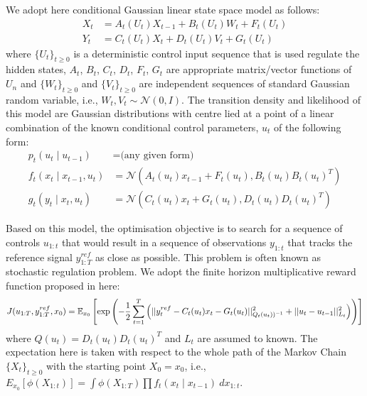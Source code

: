 We adopt here conditional Gaussian linear state space model as follows:
\begin{align}
  X_t &= A_t(U_t)X_{t-1} + B_t(U_t)W_t + F_t(U_t) \nonumber \\
  Y_t &= C_t(U_t)X_t + D_t(U_t)V_t + G_t(U_t)
\label{eq:model}
\end{align}
where $\{U_t\}_{t \geq 0}$ is a deterministic control input sequence that is used regulate the hidden states, $A_t$, $B_t$, $C_t$, $D_t$, $F_t$, $G_t$ are appropriate matrix/vector functions of $U_n$ and  $\{W_t\}_{t \geq 0}$ and  $\{V_t\}_{t \geq 0}$ are independent sequences of standard Gaussian random variable, i.e., $W_t, V_t \sim \mathcal{N}(0,I)$. The transition density and likelihood of this model are Gaussian distributions with centre lied at a point of a linear combination of the known conditional control parameters, $u_t$ of the following form:
\begin{align}
  p_t(u_t \mid u_{t-1}) &= \textrm{(any given form)} \nonumber \\
  f_t(x_t \mid x_{t-1}, u_t) &= \mathcal{N}(A_t(u_t) x_{t-1} + F_t(u_t), B_t(u_t)B_t(u_t)^T) \nonumber \\
  g_t(y_t \mid x_t, u_t)    &= \mathcal{N}(C_t(u_t) x_t + G_t(u_t), D_t(u_t)D_t(u_t)^T)
\end{align}

Based on this model, the optimisation objective is to search for a sequence of controls $u_{1:t}$ that would result in a sequence of observations $y_{1:t}$ that tracks the reference signal $y^{ref}_{1:T}$ as close as possible. This problem is often known as stochastic regulation problem. We adopt the finite horizon multiplicative reward function proposed in \cite{NK11} here:
\begin{equation}
  J(u_{1:T},y^{ref}_{1:T}, x_0) = \operatorname{\mathbb{E}}_{x_0}\left[\exp\left( -\dfrac{1}{2}\displaystyle\sum^T_{t=1}\left(\vert\vert y^{ref}_t - C_t(u_t)x_t - G_t(u_t) \vert\vert^2_{Q_t(u_t))^{-1}}  + \vert\vert u_t - u_{t-1} \vert\vert^2_{L_t}\right) \right) \right]
\end{equation}
where $Q(u_t) = D_t(u_t)D_t(u_t)^T$ and $L_t$ are assumed to known. The expectation here is taken with respect to the whole path of the Markov Chain $\{X_t\}_{t \geq 0}$ with the starting point $X_0 = x_0$,  i.e., $E_{x_0}[\phi(X_{1:t})] = \displaystyle\int \phi(X_{1:T}) \prod f_t(x_t \mid x_{t-1})~dx_{1:t}$.

